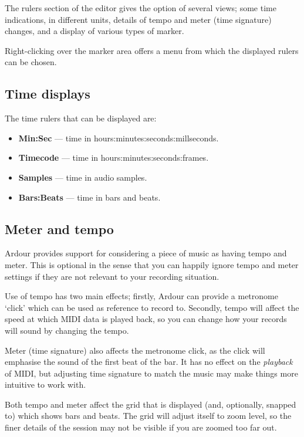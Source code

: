 \documentclass[10pt,a4paper]{book}
\begin{document}
The rulers section of the editor gives the option of several views;
some time indications, in different units, details of tempo and meter
(time signature) changes, and a display of various types of marker.

Right-clicking over the marker area offers a menu from which the
displayed rulers can be chosen.

\subsection{Time displays}

The time rulers that can be displayed are:
\begin{itemize}
\item \textbf{Min:Sec} --- time in hours:minutes:seconds:millseconds.
\item \textbf{Timecode} --- time in hours:minutes:seconds:frames.
\item \textbf{Samples} --- time in audio samples.
\item \textbf{Bars:Beats} --- time in bars and beats.
\end{itemize}

\subsection{Meter and tempo}

Ardour provides support for considering a piece of music as having
tempo and meter.  This is optional in the sense that you can happily
ignore tempo and meter settings if they are not relevant to your
recording situation.

Use of tempo has two main effects; firstly, Ardour can provide a
metronome `click' which can be used as reference to record to.
Secondly, tempo will affect the speed at which MIDI data is played
back, so you can change how your records will sound by changing the
tempo.

Meter (time signature) also affects the metronome click, as the click
will emphasise the sound of the first beat of the bar.  It has no
effect on the \emph{playback} of MIDI, but adjusting time signature to
match the music may make things more intuitive to work with.

Both tempo and meter affect the grid that is displayed (and,
optionally, snapped to) which shows bars and beats.  The grid will
adjust itself to zoom level, so the finer details of the session may
not be visible if you are zoomed too far out.
\end{document}
